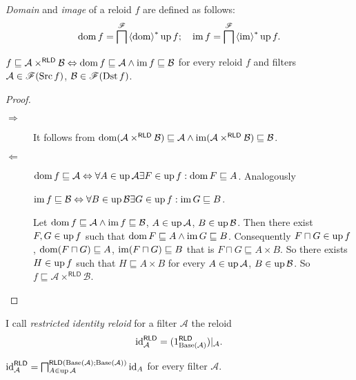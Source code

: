 \begin{defn}
\emph{Domain} and \emph{image}
of a reloid $f$ are defined as follows:
\[
\operatorname{dom} f=\bigsqcap^{\mathscr{F}}\left\langle \operatorname{dom}\right\rangle ^{\ast}\operatorname{up} f;\quad\operatorname{im} f=\bigsqcap^{\mathscr{F}}\left\langle \operatorname{im}\right\rangle ^{\ast}\operatorname{up} f.
\]
\end{defn}
\begin{prop}
$f\sqsubseteq\mathcal{A}\times^{\mathsf{RLD}}\mathcal{B}\Leftrightarrow\operatorname{dom} f\sqsubseteq\mathcal{A}\land\operatorname{im} f\sqsubseteq\mathcal{B}$
for every reloid $f$ and filters $\mathcal{A}\in\mathscr{F}(\operatorname{Src} f)$,
$\mathcal{B}\in\mathscr{F}(\operatorname{Dst} f)$.\end{prop}
\begin{proof}
~
\begin{description}
\item [{$\Rightarrow$}] It follows from $\operatorname{dom}(\mathcal{A}\times^{\mathsf{RLD}}\mathcal{B})\sqsubseteq\mathcal{A}\land\operatorname{im}(\mathcal{A}\times^{\mathsf{RLD}}\mathcal{B})\sqsubseteq\mathcal{B}$.
\item [{$\Leftarrow$}] $\operatorname{dom} f\sqsubseteq\mathcal{A}\Leftrightarrow\forall A\in\operatorname{up}\mathcal{A}\exists F\in\operatorname{up} f:\operatorname{dom} F\sqsubseteq A$.
Analogously


$\operatorname{im} f\sqsubseteq\mathcal{B}\Leftrightarrow\forall B\in\operatorname{up}\mathcal{B}\exists G\in\operatorname{up} f:\operatorname{im} G\sqsubseteq B$.


Let $\operatorname{dom} f\sqsubseteq\mathcal{A}\land\operatorname{im} f\sqsubseteq\mathcal{B}$,
$A\in\operatorname{up}\mathcal{A}$, $B\in\operatorname{up}\mathcal{B}$. Then there exist $F,G\in\operatorname{up} f$
such that $\operatorname{dom} F\sqsubseteq A\land\operatorname{im} G\sqsubseteq B$. Consequently
$F\sqcap G\in\operatorname{up} f$, $\operatorname{dom}(F\sqcap G)\sqsubseteq A$, $\operatorname{im}(F\sqcap G)\sqsubseteq B$
that is $F\sqcap G\sqsubseteq A\times B$. So there exists $H\in\operatorname{up} f$
such that $H\sqsubseteq A\times B$ for every $A\in\operatorname{up}\mathcal{A}$,
$B\in\operatorname{up}\mathcal{B}$. So $f\sqsubseteq\mathcal{A}\times^{\mathsf{RLD}}\mathcal{B}$.

\end{description}
\end{proof}
\begin{defn}
I call \emph{restricted identity
reloid} for a filter $\mathcal{A}$ the reloid
\[
\operatorname{id}_{\mathcal{A}}^{\mathsf{RLD}}=(1_{\operatorname{Base}(\mathcal{A})}^{\mathsf{RLD}})|_{\mathcal{A}}.
\]
\end{defn}
\begin{thm}
$\operatorname{id}_{\mathcal{A}}^{\mathsf{RLD}}=\bigsqcap_{A\in\operatorname{up}\mathcal{A}}^{\mathsf{RLD}(\operatorname{Base}(\mathcal{A});\operatorname{Base}(\mathcal{A}))}\operatorname{id}_{A}$
for every filter $\mathcal{A}$.\end{thm}

